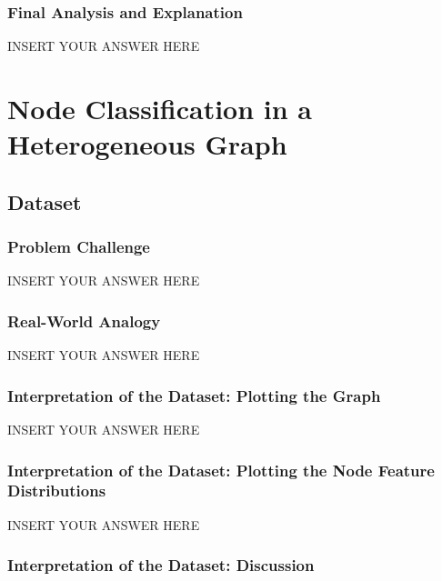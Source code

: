 \documentclass[a4paper,12pt]{article}
\begin{document}
\subsubsection{Final Analysis and Explanation}

INSERT YOUR ANSWER HERE


\section{Node Classification in a Heterogeneous Graph}\label{sec:node-classification-hetero}

\subsection{Dataset}

\subsubsection{Problem Challenge}

INSERT YOUR ANSWER HERE


\subsubsection{Real-World Analogy}

INSERT YOUR ANSWER HERE


\subsubsection{Interpretation of the Dataset: Plotting the Graph}

INSERT YOUR ANSWER HERE



\subsubsection{Interpretation of the Dataset: Plotting the Node Feature Distributions}

INSERT YOUR ANSWER HERE



\subsubsection{Interpretation of the Dataset: Discussion}
\end{document}
